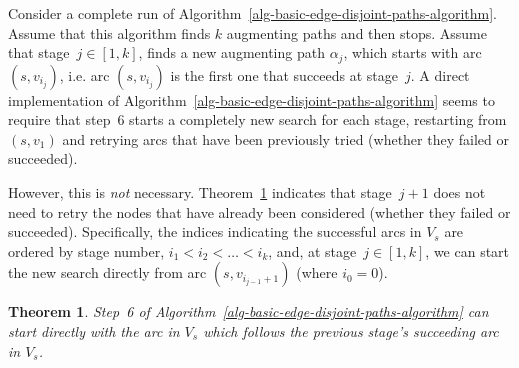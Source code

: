 \documentclass[preliminary,copyright,creativecommons]{eptcs}
\newtheorem{theorem}{Theorem}
\theoremstyle{remark}
\begin{document}
Consider a complete run of Algorithm~\ref{alg-basic-edge-disjoint-paths-algorithm}.
Assume that this algorithm finds $k$ augmenting paths and then stops. 
Assume that stage~$j \in [1,k]$, finds a new augmenting path $\alpha_j$,
which starts with arc $(s,v_{i_j})$, 
i.e. arc $(s,v_{i_j})$ is the first one that succeeds at stage~$j$.
A direct implementation of Algorithm~\ref{alg-basic-edge-disjoint-paths-algorithm} 
seems to require that step~6 starts a completely new search for each stage, 
restarting from $(s,v_1)$ and retrying arcs that have been previously tried 
(whether they failed or succeeded).

However, this is \emph{not} necessary.
Theorem~\ref{conjecture} indicates that stage~$j+1$ does not need to retry 
the nodes that have already been considered (whether they failed or succeeded).
Specifically, the indices indicating the successful arcs in $V_s$ are ordered by stage number,
$i_1 < i_2 < \dots < i_k$, and, at stage~$j \in [1,k]$, 
we can start the new search directly from arc $(s,v_{i_{j-1}+1})$
(where $i_0 = 0$). 

\begin{theorem}
\label{conjecture}
Step~6 of Algorithm~\ref{alg-basic-edge-disjoint-paths-algorithm} 
can start directly with the arc in $V_s$ 
which follows the previous stage's succeeding arc in $V_s$.
\end{theorem}
\end{document}
